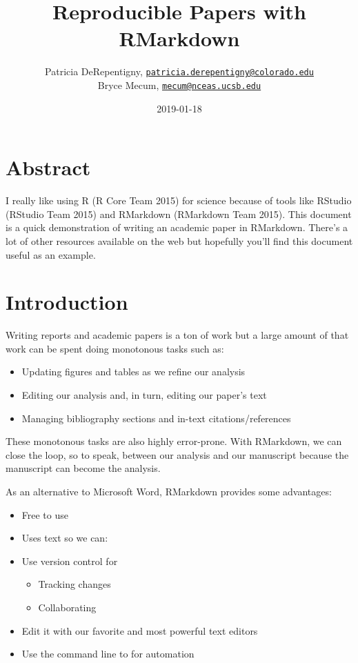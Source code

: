 \documentclass[]{article}
\title{Reproducible Papers with RMarkdown}
\author{Patricia DeRepentigny,
\href{mailto:patricia.derepentigny@colorado.edu}{\nolinkurl{patricia.derepentigny@colorado.edu}} \\ Bryce Mecum,
\href{mailto:mecum@nceas.ucsb.edu}{\nolinkurl{mecum@nceas.ucsb.edu}}}
\date{2019-01-18}
\providecommand{\tightlist}{%
  \setlength{\itemsep}{0pt}\setlength{\parskip}{0pt}}
\begin{document}
\maketitle

\section{Abstract}\label{abstract}

I really like using R (R Core Team 2015) for science because of tools
like RStudio (RStudio Team 2015) and RMarkdown (RMarkdown Team 2015).
This document is a quick demonstration of writing an academic paper in
RMarkdown. There's a lot of other resources available on the web but
hopefully you'll find this document useful as an example.

\section{Introduction}\label{introduction}

Writing reports and academic papers is a ton of work but a large amount
of that work can be spent doing monotonous tasks such as:

\begin{itemize}
\tightlist
\item
  Updating figures and tables as we refine our analysis
\item
  Editing our analysis and, in turn, editing our paper's text
\item
  Managing bibliography sections and in-text citations/references
\end{itemize}

These monotonous tasks are also highly error-prone. With RMarkdown, we
can close the loop, so to speak, between our analysis and our manuscript
because the manuscript can become the analysis.

As an alternative to Microsoft Word, RMarkdown provides some advantages:

\begin{itemize}
\tightlist
\item
  Free to use
\item
  Uses text so we can:
\item
  Use version control for

  \begin{itemize}
  \tightlist
  \item
    Tracking changes
  \item
    Collaborating
  \end{itemize}
\item
  Edit it with our favorite and most powerful text editors
\item
  Use the command line to for automation
\end{itemize}
\end{document}
